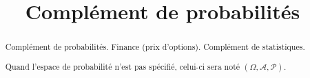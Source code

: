 \documentclass[a4paper, 12pt]{report}
\title{Complément de probabilités}
\author{}
\begin{document}
\maketitle

\begin{abstract}
Complément de probabilités.
Finance (prix d'options).
Complément de statistiques.

Quand l'espace de probabilité n'est pas spécifié, celui-ci sera noté $(\Omega,
\mathcal{A}, \mathcal{P})$.
\end{abstract}

\tableofcontents




\end{document}
